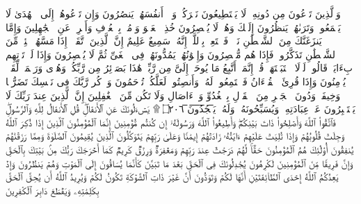 \startbuffer[\q:7:197]
وَٱلَّذِینَ تَدۡعُونَ مِن دُونِهِۦ لَا یَسۡتَطِیعُونَ نَصۡرَكُمۡ وَلَاۤ أَنفُسَهُمۡ یَنصُرُونَ%
\stopbuffer
\startbuffer[\q:7:198]
وَإِن تَدۡعُوهُمۡ إِلَى ٱلۡهُدَىٰ لَا یَسۡمَعُوا۟ۖ وَتَرَىٰهُمۡ یَنظُرُونَ إِلَیۡكَ وَهُمۡ لَا یُبۡصِرُونَ%
\stopbuffer
\startbuffer[\q:7:199]
خُذِ ٱلۡعَفۡوَ وَأۡمُرۡ بِٱلۡعُرۡفِ وَأَعۡرِضۡ عَنِ ٱلۡجَٰهِلِینَ%
\stopbuffer
\startbuffer[\q:7:200]
وَإِمَّا یَنزَغَنَّكَ مِنَ ٱلشَّیۡطَٰنِ نَزۡغࣱ فَٱسۡتَعِذۡ بِٱللَّهِۚ إِنَّهُۥ سَمِیعٌ عَلِیمٌ%
\stopbuffer
\startbuffer[\q:7:201]
إِنَّ ٱلَّذِینَ ٱتَّقَوۡا۟ إِذَا مَسَّهُمۡ طَٰۤئِفࣱ مِّنَ ٱلشَّیۡطَٰنِ تَذَكَّرُوا۟ فَإِذَا هُم مُّبۡصِرُونَ%
\stopbuffer
\startbuffer[\q:7:202]
وَإِخۡوَٰنُهُمۡ یَمُدُّونَهُمۡ فِی ٱلۡغَیِّ ثُمَّ لَا یُقۡصِرُونَ%
\stopbuffer
\startbuffer[\q:7:203]
وَإِذَا لَمۡ تَأۡتِهِم بِءَایَةࣲ قَالُوا۟ لَوۡلَا ٱجۡتَبَیۡتَهَاۚ قُلۡ إِنَّمَاۤ أَتَّبِعُ مَا یُوحَىٰۤ إِلَیَّ مِن رَّبِّیۚ هَٰذَا بَصَاۤئِرُ مِن رَّبِّكُمۡ وَهُدࣰى وَرَحۡمَةࣱ لِّقَوۡمࣲ یُؤۡمِنُونَ%
\stopbuffer
\startbuffer[\q:7:204]
وَإِذَا قُرِئَ ٱلۡقُرۡءَانُ فَٱسۡتَمِعُوا۟ لَهُۥ وَأَنصِتُوا۟ لَعَلَّكُمۡ تُرۡحَمُونَ%
\stopbuffer
\startbuffer[\q:7:205]
وَٱذۡكُر رَّبَّكَ فِی نَفۡسِكَ تَضَرُّعࣰا وَخِیفَةࣰ وَدُونَ ٱلۡجَهۡرِ مِنَ ٱلۡقَوۡلِ بِٱلۡغُدُوِّ وَٱلۡءَاصَالِ وَلَا تَكُن مِّنَ ٱلۡغَٰفِلِینَ%
\stopbuffer
\startbuffer[\q:7:206]
إِنَّ ٱلَّذِینَ عِندَ رَبِّكَ لَا یَسۡتَكۡبِرُونَ عَنۡ عِبَادَتِهِۦ وَیُسَبِّحُونَهُۥ وَلَهُۥ یَ̅سۡ̅جُ̅دُ̅و̅نَ̅ ۝٢٠٦ ۩%
\stopbuffer
\startbuffer[\q:8:1]
یَسۡءَلُونَكَ عَنِ ٱلۡأَنفَالِۖ قُلِ ٱلۡأَنفَالُ لِلَّهِ وَٱلرَّسُولِۖ فَٱتَّقُوا۟ ٱللَّهَ وَأَصۡلِحُوا۟ ذَاتَ بَیۡنِكُمۡۖ وَأَطِیعُوا۟ ٱللَّهَ وَرَسُولَهُۥۤ إِن كُنتُم مُّؤۡمِنِینَ%
\stopbuffer
\startbuffer[\q:8:2]
إِنَّمَا ٱلۡمُؤۡمِنُونَ ٱلَّذِینَ إِذَا ذُكِرَ ٱللَّهُ وَجِلَتۡ قُلُوبُهُمۡ وَإِذَا تُلِیَتۡ عَلَیۡهِمۡ ءَایَٰتُهُۥ زَادَتۡهُمۡ إِیمَٰنࣰا وَعَلَىٰ رَبِّهِمۡ یَتَوَكَّلُونَ%
\stopbuffer
\startbuffer[\q:8:3]
ٱلَّذِینَ یُقِیمُونَ ٱلصَّلَوٰةَ وَمِمَّا رَزَقۡنَٰهُمۡ یُنفِقُونَ%
\stopbuffer
\startbuffer[\q:8:4]
أُو۟لَٰۤئِكَ هُمُ ٱلۡمُؤۡمِنُونَ حَقࣰّاۚ لَّهُمۡ دَرَجَٰتٌ عِندَ رَبِّهِمۡ وَمَغۡفِرَةࣱ وَرِزۡقࣱ كَرِیمࣱ%
\stopbuffer
\startbuffer[\q:8:5]
كَمَاۤ أَخۡرَجَكَ رَبُّكَ مِنۢ بَیۡتِكَ بِٱلۡحَقِّ وَإِنَّ فَرِیقࣰا مِّنَ ٱلۡمُؤۡمِنِینَ لَكَٰرِهُونَ%
\stopbuffer
\startbuffer[\q:8:6]
یُجَٰدِلُونَكَ فِی ٱلۡحَقِّ بَعۡدَ مَا تَبَیَّنَ كَأَنَّمَا یُسَاقُونَ إِلَى ٱلۡمَوۡتِ وَهُمۡ یَنظُرُونَ%
\stopbuffer
\startbuffer[\q:8:7]
وَإِذۡ یَعِدُكُمُ ٱللَّهُ إِحۡدَى ٱلطَّاۤئِفَتَیۡنِ أَنَّهَا لَكُمۡ وَتَوَدُّونَ أَنَّ غَیۡرَ ذَاتِ ٱلشَّوۡكَةِ تَكُونُ لَكُمۡ وَیُرِیدُ ٱللَّهُ أَن یُحِقَّ ٱلۡحَقَّ بِكَلِمَٰتِهِۦ وَیَقۡطَعَ دَابِرَ ٱلۡكَٰفِرِینَ%
